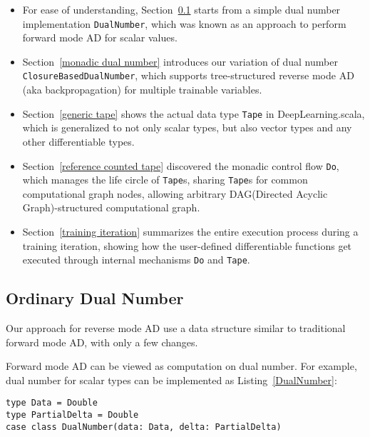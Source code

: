 \begin{itemize}

  \item For ease of understanding, Section~\ref{dual number} starts from a simple dual number implementation \lstinline{DualNumber}, which was known as an approach to perform forward mode AD for scalar values.
  
  \item Section~\ref{monadic dual number} introduces our variation of dual number \lstinline{ClosureBasedDualNumber}, which supports tree-structured reverse mode AD (aka backpropagation) for multiple \glspl{trainable variable}.

  \item Section~\ref{generic tape} shows the actual data type \lstinline{Tape} in DeepLearning.scala, which is generalized to not only scalar types, but also vector types and any other differentiable types.

  \item Section~\ref{reference counted tape} discovered the monadic control flow \lstinline{Do}, which manages the life circle of \lstinline{Tape}s, sharing \lstinline{Tape}s for common \gls{computational graph} nodes, allowing arbitrary DAG(Directed Acyclic Graph)-structured \gls{computational graph}.

  \item Section~\ref{training iteration} summarizes the entire execution process during a training iteration, showing how the user-defined \glspl{differentiable function} get executed through internal mechanisms \lstinline{Do} and \lstinline{Tape}.

\end{itemize}

\subsection{Ordinary Dual Number}
\label{dual number}

Our approach for reverse mode AD use a data structure similar to traditional forward mode AD, with only a few changes.

Forward mode AD can be viewed as computation on dual number. For example, dual number for scalar types can be implemented as Listing~\ref{DualNumber}:

\begin{lstlisting}[float={h t b p},caption={Dual number for forward mode AD}, label={DualNumber}]
type Data = Double
type PartialDelta = Double
case class DualNumber(data: Data, delta: PartialDelta)
\end{lstlisting}

